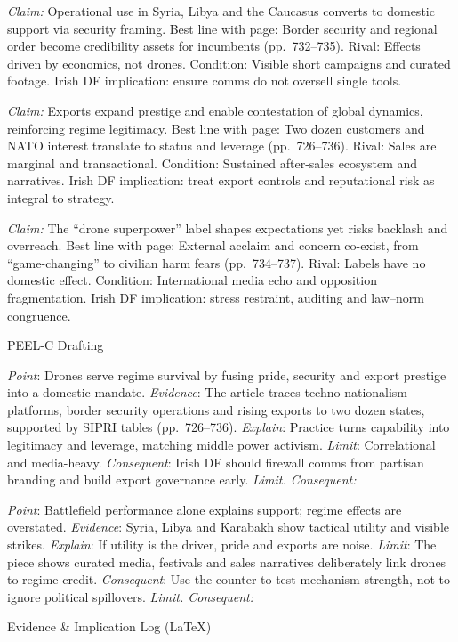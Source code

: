 \textit{Claim:} Operational use in Syria, Libya and the Caucasus converts to domestic support via security framing.
Best line with page: Border security and regional order become credibility assets for incumbents (pp.~732–735). Rival: Effects driven by economics, not drones. Condition: Visible short campaigns and curated footage. Irish DF implication: ensure comms do not oversell single tools.

\textit{Claim:} Exports expand prestige and enable contestation of global dynamics, reinforcing regime legitimacy.
Best line with page: Two dozen customers and NATO interest translate to status and leverage (pp.~726–736). Rival: Sales are marginal and transactional. Condition: Sustained after\hyp sales ecosystem and narratives. Irish DF implication: treat export controls and reputational risk as integral to strategy.

\textit{Claim:} The “drone superpower” label shapes expectations yet risks backlash and overreach.
Best line with page: External acclaim and concern co\hyp exist, from “game\hyp changing” to civilian harm fears (pp.~734–737). Rival: Labels have no domestic effect. Condition: International media echo and opposition fragmentation. Irish DF implication: stress restraint, auditing and law–norm congruence.

PEEL-C Drafting

\textit{Point}: Drones serve regime survival by fusing pride, security and export prestige into a domestic mandate.
\textit{Evidence}: The article traces techno\hyp nationalism platforms, border security operations and rising exports to two dozen states, supported by SIPRI tables (pp.~726–736).
\textit{Explain}: Practice turns capability into legitimacy and leverage, matching middle power activism.
\textit{Limit}: Correlational and media\hyp heavy.
\textit{Consequent}: Irish DF should firewall comms from partisan branding and build export governance early.
\textit{Limit. Consequent:}

\textit{Point}: Battlefield performance alone explains support; regime effects are overstated.
\textit{Evidence}: Syria, Libya and Karabakh show tactical utility and visible strikes.
\textit{Explain}: If utility is the driver, pride and exports are noise.
\textit{Limit}: The piece shows curated media, festivals and sales narratives deliberately link drones to regime credit.
\textit{Consequent}: Use the counter to test mechanism strength, not to ignore political spillovers.
\textit{Limit. Consequent:}

Evidence & Implication Log (LaTeX)

